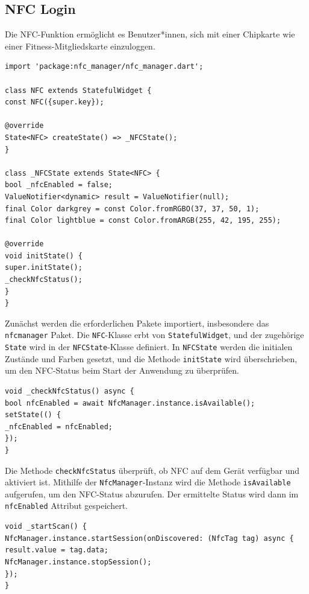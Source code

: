\pagebreak

\subsection{NFC Login}

Die NFC-Funktion ermöglicht es Benutzer*innen, sich mit einer Chipkarte wie einer Fitness-Mitgliedskarte einzuloggen.


\begin{lstlisting}[caption=NFC Package und State,label=lst:impl:frontend:qrcode]
import 'package:nfc_manager/nfc_manager.dart';

class NFC extends StatefulWidget {
const NFC({super.key});

@override
State<NFC> createState() => _NFCState();
}

class _NFCState extends State<NFC> {
bool _nfcEnabled = false;
ValueNotifier<dynamic> result = ValueNotifier(null);
final Color darkgrey = const Color.fromRGBO(37, 37, 50, 1);
final Color lightblue = const Color.fromARGB(255, 42, 195, 255);

@override
void initState() {
super.initState();
_checkNfcStatus();
}
}
\end{lstlisting}

Zunächst werden die erforderlichen Pakete importiert, insbesondere das \texttt{nfcmanager} Paket. Die \texttt{NFC}-Klasse erbt von \texttt{StatefulWidget}, und der zugehörige \texttt{State} wird in der \texttt{NFCState}-Klasse definiert. In \texttt{NFCState} werden die initialen Zustände und Farben gesetzt, und die Methode \texttt{initState} wird überschrieben, um den NFC-Status beim Start der Anwendung zu überprüfen.
\newline

\begin{lstlisting}[caption=NFC Status überprüfen,label=lst:impl:frontend:qrcode]
void _checkNfcStatus() async {
bool nfcEnabled = await NfcManager.instance.isAvailable();
setState(() {
_nfcEnabled = nfcEnabled;
});
}
\end{lstlisting}

Die Methode \texttt{checkNfcStatus} überprüft, ob NFC auf dem Gerät verfügbar und aktiviert ist. Mithilfe der \texttt{NfcManager}-Instanz wird die Methode \texttt{isAvailable} aufgerufen, um den NFC-Status abzurufen. Der ermittelte Status wird dann im \texttt{nfcEnabled} Attribut gespeichert.
\pagebreak

\begin{lstlisting}[caption=NFC Tag scannen,label=lst:impl:frontend:qrcode]
void _startScan() {
NfcManager.instance.startSession(onDiscovered: (NfcTag tag) async {
result.value = tag.data;
NfcManager.instance.stopSession();
});
}
\end{lstlisting}

